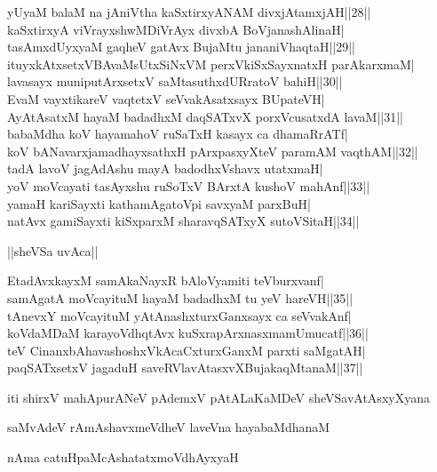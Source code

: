 \documentclass{article}
\begin{document}
yUyaM balaM na jAniVtha kaSxtirxyANAM divxjAtamxjAH||28||\\
kaSxtirxyA viVrayxshwMDiVrAyx divxbA BoVjanashAlinaH|\\
tasAmxdUyxyaM gaqheV gatAvx BujaMtu jananiVhaqtaH||29||\\
ituyxkAtxsetxVBAvaMsUtxSiNxVM perxVkiSxSayxnatxH parAkarxmaM|\\
lavasayx muniputArxsetxV saMtasuthxdURratoV bahiH||30||\\
EvaM vayxtikareV vaqtetxV seVvakAsatxsayx BUpateVH|\\
AyAtAsatxM hayaM badadhxM daqSATxvX porxVcusatxdA lavaM||31||\\
babaMdha koV  hayamahoV ruSaTxH kasayx ca dhamaRrATf|\\
koV bANavarxjamadhayxsathxH pArxpasxyXteV paramAM vaqthAM||32||\\
tadA lavoV jagAdAshu mayA badodhxVshavx utatxmaH|\\
yoV moVcayati tasAyxshu ruSoTxV BArxtA kushoV mahAnf||33||\\
yamaH kariSayxti kathamAgatoVpi savxyaM parxBuH|\\
natAvx gamiSayxti kiSxparxM sharavqSATxyX sutoVSitaH||34||\\

\begin{center}
||sheVSa uvAca||
\end{center}

EtadAvxkayxM samAkaNayxR bAloVyamiti teVburxvanf|\\
samAgatA moVcayituM hayaM badadhxM tu yeV hareVH||35||\\
tAnevxY moVcayituM yAtAnashxturxGanxsayx ca seVvakAnf|\\
koVdaMDaM karayoVdhqtAvx kuSxrapArxnasxmamUmucatf||36||\\
teV CinanxbAhavashoshxVkAcaCxturxGanxM parxti saMgatAH|\\
paqSATxsetxV jagaduH saveRVlavAtasxvXBujakaqMtanaM||37||

\begin{center}
iti shirxV mahApurANeV pAdemxV pAtALaKaMDeV sheVSavAtAsxyXyana
\end{center}

\begin{center}
saMvAdeV rAmAshavxmeVdheV laveVna hayabaMdhanaM
\end{center}

\begin{center}
nAma catuHpaMcAshatatxmoVdhAyxyaH
\end{center}
\end{document}
